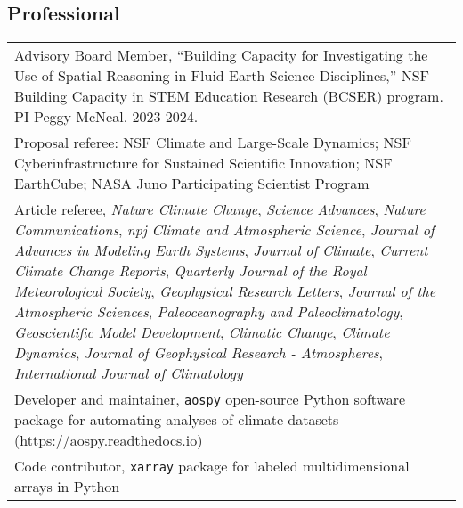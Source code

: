 \documentclass[letterpaper,11pt]{shillcv}
\begin{document}
\subsection*{Professional}
\begin{longtable}{@{} L{\textwidth} @{}}

Advisory Board Member, ``Building Capacity for Investigating the Use of Spatial Reasoning in Fluid-Earth Science Disciplines,'' NSF Building Capacity in STEM Education Research (BCSER) program.  PI Peggy McNeal.  2023-2024.\\


Proposal referee: NSF Climate and Large-Scale Dynamics; NSF Cyberinfrastructure for Sustained Scientific Innovation; NSF EarthCube; NASA Juno Participating Scientist Program\\

Article referee, \emph{Nature Climate Change}, \emph{Science Advances}, \emph{Nature Communications}, \emph{npj Climate and Atmospheric Science}, \emph{Journal of Advances in Modeling Earth Systems}, \emph{Journal of Climate}, \emph{Current Climate Change Reports}, \emph{Quarterly Journal of the Royal Meteorological Society}, \emph{Geophysical Research Letters}, \emph{Journal of the Atmospheric Sciences}, \emph{Paleoceanography and Paleoclimatology}, \emph{Geoscientific Model Development}, \emph{Climatic Change}, \emph{Climate Dynamics}, \emph{Journal of Geophysical Research - Atmospheres}, \emph{International Journal of Climatology}\\

Developer and maintainer, \texttt{aospy} open-source Python software package for automating analyses of climate datasets (\href{https://aospy.readthedocs.io}{https://aospy.readthedocs.io})\\

Code contributor, \texttt{xarray} package for labeled multidimensional arrays in Python\\
\end{longtable}
\end{document}
